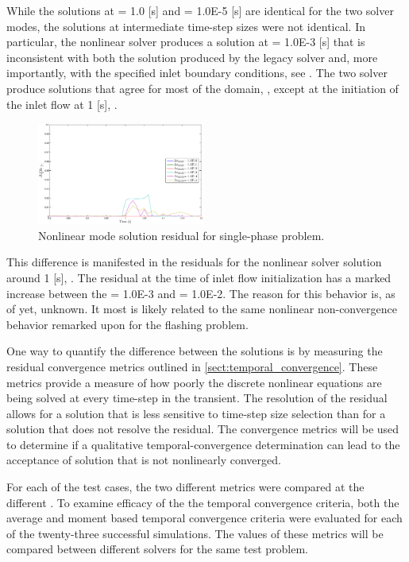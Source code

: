 While the solutions at \dtmax{} = 1.0 [s] and \dtmax{} = 1.0E-5 [s] are identical for the two solver modes, the solutions at intermediate time-step sizes were not identical.
In particular, the nonlinear solver produces a solution at \dtmax{} = 1.0E-3 [s] that is inconsistent with both the solution produced by the legacy solver and, more importantly, with the specified inlet boundary conditions, see .
The two solver produce solutions that agree for most of the domain, , except at the initiation of the inlet flow at 1 [s], .

\begin{figure}[h!t]
\centering
\includegraphics[width=0.49\textwidth]{images/nl_res_single_zoom.eps}
\caption{Nonlinear mode solution residual for single-phase problem.}
\label{fig:nl_res_single_zoom}
\end{figure}

This difference is manifested in the residuals for the nonlinear solver solution around 1 [s], .
The residual at the time of inlet flow initialization has a marked increase between the \dtmax{} = 1.0E-3 and \dtmax{} = 1.0E-2.
The reason for this behavior is, as of yet, unknown.
It most is likely related to the same nonlinear non-convergence behavior remarked upon for the flashing problem. 

One way to quantify the difference between the solutions is by measuring the residual convergence metrics outlined in \ref{sect:temporal_convergence}.
These metrics provide a measure of how poorly the discrete nonlinear equations are being solved at every time-step in the transient.
The resolution of the residual allows for a solution that is less sensitive to time-step size selection than for a solution that does not resolve the residual.
The convergence metrics will be used to determine if a qualitative temporal-convergence determination can lead to the acceptance of solution that is not nonlinearly converged.

For each of the test cases, the two different metrics were compared at the different \dtmax{}.
To examine efficacy of the the temporal convergence criteria, both the average and moment based temporal convergence criteria were evaluated for each of the twenty-three successful simulations.
The values of these metrics will be compared between different solvers for the same test problem. 

